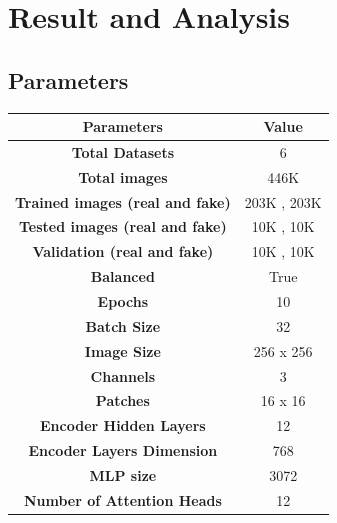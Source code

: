 \section{Result and Analysis}
\subsection{Parameters}
\begin{table}[h]
    \centering
    \renewcommand{\arraystretch}{1.5} %
    \begin{tabular}{|c|c|}
        \hline
        \textbf{Parameters}                     & \textbf{Value}      \\
        \hline
        \textbf{Total Datasets}                 & 6                   \\
        \hline
        \textbf{Total images}                   & 446K                \\
        \hline
        \textbf{Trained images (real and fake)} & 203K , 203K         \\
        \hline
        \textbf{Tested images (real and fake)}  & 10K , 10K           \\
        \hline
        \textbf{Validation (real and fake)}     & 10K , 10K           \\
        \hline
        \textbf{Balanced}                       & True                \\
        \hline
        \textbf{Epochs}                         & 10                  \\
        \hline
        \textbf{Batch Size}                     & 32                  \\
        \hline
        \textbf{Image Size}                     & 256 x 256           \\
        \hline
        \textbf{Channels}                       & 3                   \\
        \hline
        \textbf{Patches}                        & 16 x 16             \\
        \hline
        \textbf{Encoder Hidden Layers}          & 12                  \\
        \hline
        \textbf{Encoder Layers Dimension}       & 768                 \\
        \hline
        \textbf{MLP size}                       & 3072                \\
        \hline
        \textbf{ Number of Attention Heads }    & 12                  \\

\end{tabular}
\end{table}
